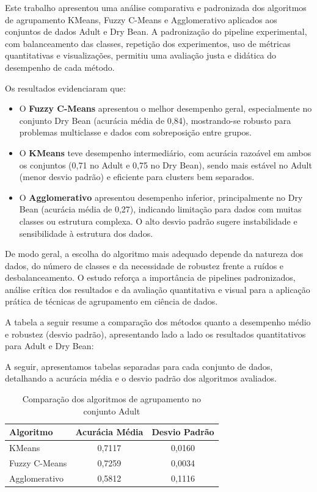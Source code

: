 Este trabalho apresentou uma análise comparativa e padronizada dos algoritmos de agrupamento KMeans, Fuzzy C-Means e Agglomerativo aplicados aos conjuntos de dados Adult e Dry Bean. A padronização do pipeline experimental, com balanceamento das classes, repetição dos experimentos, uso de métricas quantitativas e visualizações, permitiu uma avaliação justa e didática do desempenho de cada método.

Os resultados evidenciaram que:
\begin{itemize}
    \item O \textbf{Fuzzy C-Means} apresentou o melhor desempenho geral, especialmente no conjunto Dry Bean (acurácia média de 0,84), mostrando-se robusto para problemas multiclasse e dados com sobreposição entre grupos.
    \item O \textbf{KMeans} teve desempenho intermediário, com acurácia razoável em ambos os conjuntos (0,71 no Adult e 0,75 no Dry Bean), sendo mais estável no Adult (menor desvio padrão) e eficiente para clusters bem separados.
    \item O \textbf{Agglomerativo} apresentou desempenho inferior, principalmente no Dry Bean (acurácia média de 0,27), indicando limitação para dados com muitas classes ou estrutura complexa. O alto desvio padrão sugere instabilidade e sensibilidade à estrutura dos dados.
\end{itemize}

De modo geral, a escolha do algoritmo mais adequado depende da natureza dos dados, do número de classes e da necessidade de robustez frente a ruídos e desbalanceamento. O estudo reforça a importância de pipelines padronizados, análise crítica dos resultados e da avaliação quantitativa e visual para a aplicação prática de técnicas de agrupamento em ciência de dados.

A tabela a seguir resume a comparação dos métodos quanto a desempenho médio e robustez (desvio padrão), apresentando lado a lado os resultados quantitativos para Adult e Dry Bean:

A seguir, apresentamos tabelas separadas para cada conjunto de dados, detalhando a acurácia média e o desvio padrão dos algoritmos avaliados.

\begin{table}[H]
\centering
\caption{Comparação dos algoritmos de agrupamento no conjunto Adult}
\begin{tabular}{lcc}
\toprule
\textbf{Algoritmo} & \textbf{Acurácia Média} & \textbf{Desvio Padrão} \\
\midrule
KMeans & 0,7117 & 0,0160 \\
Fuzzy C-Means & 0,7259 & 0,0034 \\
Agglomerativo & 0,5812 & 0,1116 \\
\bottomrule
\end{tabular}
\label{tab:comparacao_adult}
\end{table}

